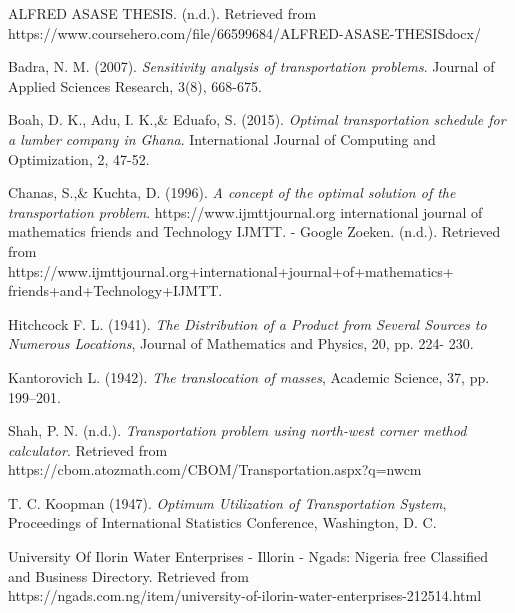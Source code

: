 \documentclass[12pt]{report}
\begin{document}
	\begin{description}
		\item ALFRED ASASE THESIS. (n.d.). Retrieved from\\  https://www.coursehero.com/file/66599684/ALFRED-ASASE-THESISdocx/	
		
		\item Badra, N. M. (2007). \emph{Sensitivity analysis of transportation problems}. Journal of Applied Sciences Research, 3(8), 668-675.
				
		\item Boah, D. K., Adu, I. K.,\& Eduafo, S. (2015). \emph{Optimal transportation schedule for a lumber company in Ghana}. International Journal of Computing and Optimization, 2, 47-52.	
		
		\item Chanas, S.,\& Kuchta, D. (1996). \emph{A concept of the optimal solution of the transportation problem}.
		https://www.ijmttjournal.org international journal of mathematics friends and Technology IJMTT. - Google Zoeken. (n.d.). Retrieved from\\ https://www.ijmttjournal.org+international+journal+of+mathematics+\\friends+and+Technology+IJMTT.

		\item Hitchcock F. L. (1941). \emph{The Distribution of a Product from Several Sources to Numerous Locations}, Journal of Mathematics and Physics, 20, pp. 224- 230.
		
		
		\item Kantorovich L. (1942). \emph{The translocation of masses}, Academic Science, 37, pp. 199–201.
		
		\item Shah, P. N. (n.d.). \emph{Transportation problem using north-west corner method calculator}. Retrieved from\\ https://cbom.atozmath.com/CBOM/Transportation.aspx?q=nwcm

		\item T. C. Koopman (1947). \emph{Optimum Utilization of Transportation System}, Proceedings of International Statistics Conference, Washington, D. C.	
		
		\item University Of Ilorin Water Enterprises - Illorin - Ngads: Nigeria free Classified and Business Directory. Retrieved from\\ https://ngads.com.ng/item/university-of-ilorin-water-enterprises-212514.html
	\end{description}
	
\end{document}
